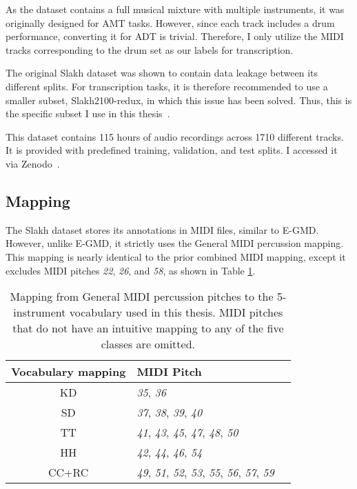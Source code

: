 As the dataset contains a full musical mixture with multiple instruments, it was originally designed for \gls{AMT} tasks. However, since each track includes a drum performance, converting it for \gls{ADT} is trivial. Therefore, I only utilize the MIDI tracks corresponding to the drum set as our labels for transcription.

The original Slakh dataset was shown to contain data leakage between its different splits. For transcription tasks, it is therefore recommended to use a smaller subset, Slakh2100-redux, in which this issue has been solved. Thus, this is the specific subset I use in this thesis~\cite{manilow_2019_4599666}.

This dataset contains 115 hours of audio recordings across 1710 different tracks. It is provided with predefined training, validation, and test splits. I accessed it via Zenodo~\cite{manilow_2019_4599666}.

\subsection{Mapping}

The Slakh dataset stores its annotations in MIDI files, similar to E-GMD. However, unlike E-GMD, it strictly uses the General MIDI percussion mapping. This mapping is nearly identical to the prior combined MIDI mapping, except it excludes MIDI pitches \textit{22}, \textit{26}, and \textit{58}, as shown in Table \ref{MIDIMapping}.

\begin{table}[H]
    \centering
    \hspace*{-0.6cm}
    \begin{tabular}{c|ll}
        Vocabulary mapping & MIDI Pitch \\
        \hline
        \acrfull{KD} & \textit{35}, \textit{36} \\
        \acrfull{SD} & \textit{37}, \textit{38}, \textit{39}, \textit{40} \\
        \acrfull{TT} & \textit{41}, \textit{43}, \textit{45}, \textit{47}, \textit{48}, \textit{50} \\
        \acrfull{HH} & \textit{42}, \textit{44}, \textit{46}, \textit{54} \\
        \acrfull{CC+RC} & \textit{49}, \textit{51}, \textit{52}, \textit{53}, \textit{55}, \textit{56}, \textit{57}, \textit{59} \\
    \end{tabular}
    \caption{Mapping from General MIDI percussion pitches to the 5-instrument vocabulary used in this thesis. MIDI pitches that do not have an intuitive mapping to any of the five classes are omitted.}
    \label{MIDIMapping}
\end{table}

